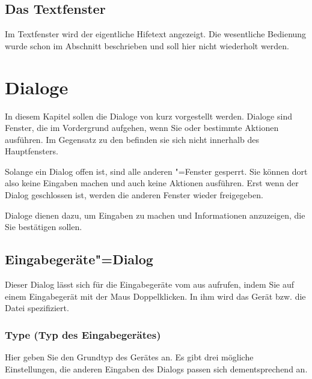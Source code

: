 {
\section{Das Textfenster}
\label{sec:das-textfenster}


Im Textfenster wird der eigentliche Hifetext angezeigt. Die wesentliche Bedienung wurde schon im Abschnitt  beschrieben und soll hier nicht wiederholt werden.

\chapter{Dialoge}\label{sec:DE_DIALOGS}

In diesem Kapitel sollen die Dialoge von \mutabor{} kurz vorgestellt
werden.  Dialoge sind Fenster, die im Vordergrund aufgehen, wenn Sie
oder \mutabor{} bestimmte Aktionen ausführen. Im Gegensatz zu den
 befinden sie sich nicht
innerhalb des Hauptfensters.

Solange ein Dialog offen ist, sind alle anderen \mutabor"=Fenster
gesperrt. Sie können dort also keine Eingaben machen und auch keine
Aktionen ausführen. Erst wenn der Dialog geschlossen ist, werden die
anderen Fenster wieder freigegeben.

Dialoge dienen dazu, um Eingaben zu machen und Informationen
anzuzeigen, die Sie bestätigen sollen.  

\section{Eingabegeräte"=Dialog}
\label{sec:DE_R0}
Dieser Dialog lässt sich für die Eingabegeräte vom  
aus aufrufen, indem Sie auf einem Eingabegerät mit der Maus 
Doppelklicken. In ihm wird das Gerät bzw. die Datei spezifiziert.

\subsection{Type (Typ des Eingabegerätes)}


Hier geben Sie den Grundtyp des Gerätes an. Es gibt drei mögliche 
Einstellungen, die anderen Eingaben des Dialogs passen sich dementsprechend 
an.

}
